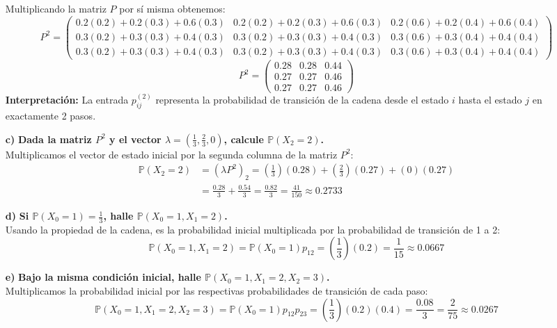 \documentclass[10pt,a4paper]{book}
\begin{document}
\begin{itemize}
    Multiplicando la matriz $P$ por sí misma obtenemos:
    \[ P^2 = \begin{pmatrix} 
    0.2(0.2)+0.2(0.3)+0.6(0.3) & 0.2(0.2)+0.2(0.3)+0.6(0.3) & 0.2(0.6)+0.2(0.4)+0.6(0.4) \\ 
    0.3(0.2)+0.3(0.3)+0.4(0.3) & 0.3(0.2)+0.3(0.3)+0.4(0.3) & 0.3(0.6)+0.3(0.4)+0.4(0.4) \\ 
    0.3(0.2)+0.3(0.3)+0.4(0.3) & 0.3(0.2)+0.3(0.3)+0.4(0.3) & 0.3(0.6)+0.3(0.4)+0.4(0.4) 
    \end{pmatrix} \]
    \[ P^2 = \begin{pmatrix} 0.28 & 0.28 & 0.44 \\ 0.27 & 0.27 & 0.46 \\ 0.27 & 0.27 & 0.46 \end{pmatrix} \]
    \textbf{Interpretación:} La entrada $p_{ij}^{(2)}$ representa la probabilidad de transición de la cadena desde el estado $i$ hasta el estado $j$ en exactamente 2 pasos.

    \item[\textbf{c)}] \textbf{Dada la matriz $P^2$ y el vector $\lambda = (\frac{1}{3}, \frac{2}{3}, 0)$, calcule $\mathbb{P}(X_2 = 2)$.} \\
    Multiplicamos el vector de estado inicial por la segunda columna de la matriz $P^2$:
    \begin{align*}
        \mathbb{P}(X_2 = 2) &= (\lambda P^2)_2 = \left(\frac{1}{3}\right)(0.28) + \left(\frac{2}{3}\right)(0.27) + (0)(0.27) \\
        &= \frac{0.28}{3} + \frac{0.54}{3} = \frac{0.82}{3} = \frac{41}{150} \approx 0.2733
    \end{align*}

    \item[\textbf{d)}] \textbf{Si $\mathbb{P}(X_0 = 1) = \frac{1}{3}$, halle $\mathbb{P}(X_0 = 1, X_1 = 2)$.} \\
    Usando la propiedad de la cadena, es la probabilidad inicial multiplicada por la probabilidad de transición de 1 a 2:
    \[ \mathbb{P}(X_0 = 1, X_1 = 2) = \mathbb{P}(X_0 = 1) p_{12} = \left(\frac{1}{3}\right)(0.2) = \frac{1}{15} \approx 0.0667 \]

    \item[\textbf{e)}] \textbf{Bajo la misma condición inicial, halle $\mathbb{P}(X_0 = 1, X_1 = 2, X_2 = 3)$.} \\
    Multiplicamos la probabilidad inicial por las respectivas probabilidades de transición de cada paso:
    \[ \mathbb{P}(X_0 = 1, X_1 = 2, X_2 = 3) = \mathbb{P}(X_0 = 1) p_{12} p_{23} = \left(\frac{1}{3}\right)(0.2)(0.4) = \frac{0.08}{3} = \frac{2}{75} \approx 0.0267 \]


\end{itemize}
\end{document}
